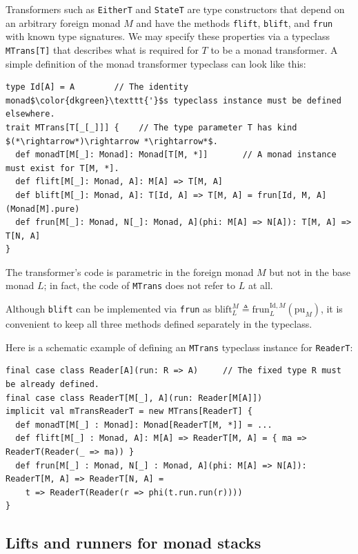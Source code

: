 Transformers such as \lstinline!EitherT! and \lstinline!StateT!
are type constructors that depend on an arbitrary foreign monad $M$
and have the methods \lstinline!flift!, \lstinline!blift!, and \lstinline!frun!
with known type signatures. We may specify these properties via a
typeclass \lstinline!MTrans[T]! that describes what is required for
$T$ to be a monad transformer. A simple definition of the monad transformer
typeclass can look like this:
\begin{lstlisting}[mathescape=true]
type Id[A] = A        // The identity monad$\color{dkgreen}\texttt{'}$s typeclass instance must be defined elsewhere.
trait MTrans[T[_[_]]] {    // The type parameter T has kind $(*\rightarrow*)\rightarrow *\rightarrow*$.
  def monadT[M[_]: Monad]: Monad[T[M, *]]       // A monad instance must exist for T[M, *].
  def flift[M[_]: Monad, A]: M[A] => T[M, A]
  def blift[M[_]: Monad, A]: T[Id, A] => T[M, A] = frun[Id, M, A](Monad[M].pure)
  def frun[M[_]: Monad, N[_]: Monad, A](phi: M[A] => N[A]): T[M, A] => T[N, A]
}
\end{lstlisting}
The transformer\textsf{'}s code is parametric in the foreign monad $M$ but
not in the base monad $L$; in fact, the code of \lstinline!MTrans!
does not refer to $L$ at all.

Although \lstinline!blift! can be implemented via \lstinline!frun!
as $\text{blift}_{L}^{M}\triangleq\text{frun}_{L}^{\text{Id},M}(\text{pu}_{M})$,
it is convenient to keep all three methods defined separately in the
typeclass.

Here is a schematic example of defining an \lstinline!MTrans! typeclass
instance for \lstinline!ReaderT!:
\begin{lstlisting}
final case class Reader[A](run: R => A)     // The fixed type R must be already defined.
final case class ReaderT[M[_], A](run: Reader[M[A]])
implicit val mTransReaderT = new MTrans[ReaderT] {
  def monadT[M[_] : Monad]: Monad[ReaderT[M, *]] = ...
  def flift[M[_] : Monad, A]: M[A] => ReaderT[M, A] = { ma => ReaderT(Reader(_ => ma)) }
  def frun[M[_] : Monad, N[_] : Monad, A](phi: M[A] => N[A]): ReaderT[M, A] => ReaderT[N, A] =
    t => ReaderT(Reader(r => phi(t.run.run(r))))
}
\end{lstlisting}


\subsection{Lifts and runners for monad stacks}

